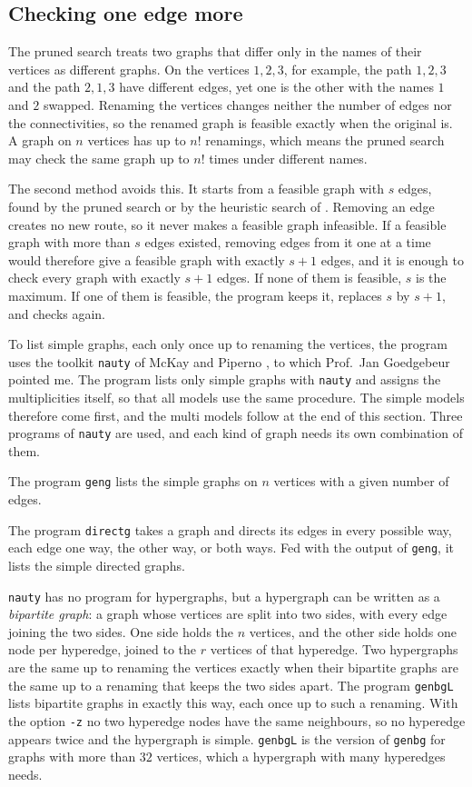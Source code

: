 \subsection{Checking one edge more}\label{sec:one-more}
The pruned search treats two graphs that differ only in the names of their vertices as different graphs. On the vertices $1,2,3$, for example, the path $1,2,3$ and the path $2,1,3$ have different edges, yet one is the other with the names $1$ and $2$ swapped.
Renaming the vertices changes neither the number of edges nor the connectivities, so the renamed graph is feasible exactly when the original is.
A graph on $n$ vertices has up to $n!$ renamings, which means the pruned search may check the same graph up to $n!$ times under different names.

The second method avoids this.
It starts from a feasible graph with $s$ edges, found by the pruned search or by the heuristic search of .
Removing an edge creates no new route, so it never makes a feasible graph infeasible.
If a feasible graph with more than $s$ edges existed, removing edges from it one at a time would therefore give a feasible graph with exactly $s+1$ edges, and it is enough to check every graph with exactly $s+1$ edges.
If none of them is feasible, $s$ is the maximum.
If one of them is feasible, the program keeps it, replaces $s$ by $s+1$, and checks again.

To list simple graphs, each only once up to renaming the vertices, the program uses the toolkit \texttt{nauty} of McKay and Piperno \cite{McKayPiperno14,NautyGuide29}, to which Prof.\ Jan Goedgebeur pointed me.
The program lists only simple graphs with \texttt{nauty} and assigns the multiplicities itself, so that all models use the same procedure. The simple models therefore come first, and the multi models follow at the end of this section.
Three programs of \texttt{nauty} are used, and each kind of graph needs its own combination of them.

The program \texttt{geng} lists the simple graphs on $n$ vertices with a given number of edges.

The program \texttt{directg} takes a graph and directs its edges in every possible way, each edge one way, the other way, or both ways. Fed with the output of \texttt{geng}, it lists the simple directed graphs.

\texttt{nauty} has no program for hypergraphs, but a hypergraph can be written as a \emph{bipartite graph}: a graph whose vertices are split into two sides, with every edge joining the two sides.
One side holds the $n$ vertices, and the other side holds one node per hyperedge, joined to the $r$ vertices of that hyperedge.
Two hypergraphs are the same up to renaming the vertices exactly when their bipartite graphs are the same up to a renaming that keeps the two sides apart.
The program \texttt{genbgL} lists bipartite graphs in exactly this way, each once up to such a renaming.
With the option \texttt{-z} no two hyperedge nodes have the same neighbours, so no hyperedge appears twice and the hypergraph is simple.
\texttt{genbgL} is the version of \texttt{genbg} for graphs with more than $32$ vertices, which a hypergraph with many hyperedges needs.

